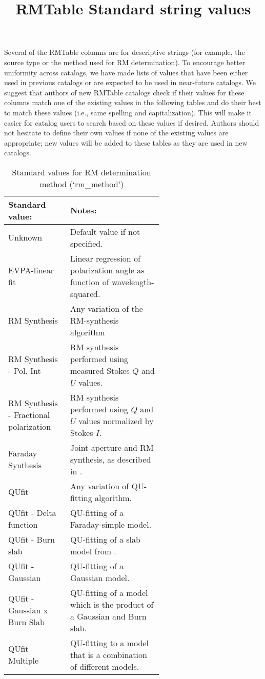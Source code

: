 \documentclass[10pt,modern]{aastex63}
\begin{document}
 
\title{RMTable Standard string values}
 
 
Several of the RMTable columns are for descriptive strings (for example, the source type or the method used for RM determination). To encourage better uniformity across catalogs, we have made lists of values that have been either used in previous catalogs or are expected to be used in near-future catalogs. We suggest that authors of new RMTable catalogs check if their values for these columns match one of the existing values in the following tables and do their best to match these values (i.e., same spelling and capitalization). This will make it easier for catalog users to search based on these values if desired. Authors should not hesitate to define their own values if none of the existing values are appropriate; new values will be added to these tables as they are used in new catalogs.


\begin{table}[h]
\caption{Standard values for RM determination method (`rm\_method')}\label{tab:rm_method}
\begin{center}
\begin{tabular}{|l|p{0.6\linewidth}|} \hline

{\bf Standard value:} & {\bf Notes:} \\ \hline
Unknown & Default value if not specified.\\
EVPA-linear fit & Linear regression of polarization angle as function of wavelength-squared.\\
RM Synthesis & Any variation of the RM-synthesis algorithm\\
RM Synthesis - Pol. Int & RM synthesis performed using measured Stokes $Q$ and $U$ values.\\
RM Synthesis - Fractional polarization & RM synthesis performed using $Q$ and $U$ values normalized by Stokes $I$.\\
Faraday Synthesis & Joint aperture and RM synthesis, as described in \citet{Bell2012}.\\
QUfit & Any variation of QU-fitting algorithm.\\
QUfit - Delta function & QU-fitting of a Faraday-simple model.\\
QUfit - Burn slab & QU-fitting of a slab model from \citet{Burn66}.\\
QUfit - Gaussian & QU-fitting of a Gaussian model.\\
QUfit - Gaussian x Burn Slab & QU-fitting of a model which is the product of a Gaussian and Burn slab.\\
QUfit - Multiple & QU-fitting to a model that is a combination of different models.\\
\hline
\end{tabular}
\end{center}
\label{default}
\end{table}%
\end{document}

